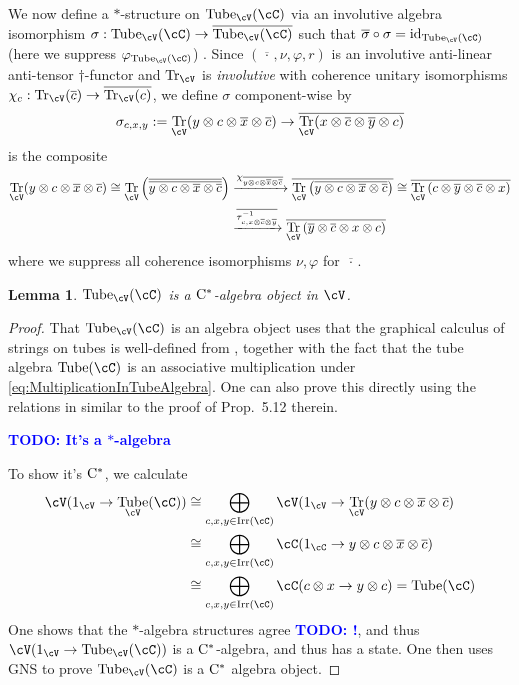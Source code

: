 \documentclass[11pt]{article}
\theoremstyle{plain}
\newtheorem{lem}[thm]{Lemma}
\theoremstyle{definition}
\DeclareMathOperator{\id}{id}
\DeclareMathOperator{\Irr}{Irr}
\DeclareMathOperator{\Tr}{Tr}
\DeclareMathOperator{\Tube}{Tube}
\newcommand{\todo}[1]{\textcolor{blue}{\textbf{TODO: #1}}}
\newcommand{\Cstar}{{\rm C^*}}
\begin{document}
We now define a $*$-structure on $\Tube_\cV(\cC)$ via an involutive algebra isomorphism $\sigma: \Tube_\cV(\cC) \to \overline{\Tube_\cV(\cC)}$ such that $\overline{\sigma}\circ \sigma = \id_{\Tube_\cV(\cC)}$ (here we suppress $\varphi_{\Tube_\cV(\cC)}$) \cite[Prop.~3.19]{MR3687214}.
Since $(\overline{\,\cdot\,},\nu,\varphi,r)$ is an involutive anti-linear anti-tensor $\dag$-functor and $\Tr_\cV$ is \emph{involutive} \cite{uAPA} with coherence unitary isomorphisms $\chi_c : \Tr_\cV(\overline{c}) \to \overline{\Tr_\cV(c)}$, we define $\sigma$ component-wise by
$$
\sigma_{c,x,y}:= 
\Tr_\cV(y\otimes c\otimes \overline{x}\otimes \overline{c})
\to
\overline{\Tr_\cV(x\otimes \overline{c}\otimes \overline{y}\otimes c)}
$$
is the composite
\begin{align*}
\Tr_\cV(y\otimes c\otimes \overline{x}\otimes \overline{c})
\cong
\Tr_\cV\left(\overline{\overline{y\otimes c\otimes \overline{x}\otimes \overline{c}}}\right)
&\xrightarrow{\chi_{\overline{y\otimes c\otimes \overline{x}\otimes \overline{c}}}}
\overline{\Tr_\cV\left(\overline{y\otimes c\otimes \overline{x}\otimes \overline{c}}\right)}
\cong
\overline{\Tr_\cV\left(c\otimes \overline{y}\otimes \overline{c}\otimes x\right)}
\\&\xrightarrow{\overline{\tau^{-1}_{c, x\otimes \overline{c}\otimes \overline{y}}}}
\overline{\Tr_\cV\left(\overline{y}\otimes \overline{c}\otimes x\otimes c\right)}
\end{align*}
where we suppress all coherence isomorphisms $\nu,\varphi$ for $\overline{\,\cdot\,}$.

\begin{lem}
$\Tube_\cV(\cC)$ is a $\Cstar$-algebra object in $\cV$.
\end{lem}
\begin{proof}
That $\Tube_\cV(\cC)$ is an algebra object uses that the graphical calculus of strings on tubes is well-defined from \cite{1607.06041}, together with the fact that the tube algebra $\Tube(\cC)$ is an associative multiplication under \eqref{eq:MultiplicationInTubeAlgebra}.
One can also prove this directly using the relations in \cite{MR3578212} similar to the proof of Prop.~5.12 therein.

\todo{It's a $*$-algebra}

To show it's $\Cstar$, we calculate
\begin{align*}
\cV(1_\cV \to \Tube_\cV(\cC))
&\cong
\bigoplus_{c,x,y\in \Irr(\cC)} \cV(1_\cV \to \Tr_\cV(y\otimes c\otimes \overline{x} \otimes \overline{c})
\\&\cong
\bigoplus_{c,x,y\in \Irr(\cC)} \cC(1_\cC \to y\otimes c\otimes \overline{x} \otimes \overline{c})
\\&\cong
\bigoplus_{c,x,y\in \Irr(\cC)} \cC(c\otimes x \to y\otimes c)
=
\Tube(\cC)
\end{align*}
One shows that the $*$-algebra structures agree \todo{!}, and thus $\cV(1_\cV \to \Tube_\cV(\cC))$ is a $\Cstar$-algebra, and thus has a state.
One then uses GNS to prove $\Tube_\cV(\cC)$ is a $\Cstar$ algebra object.
\end{proof}
\end{document}
